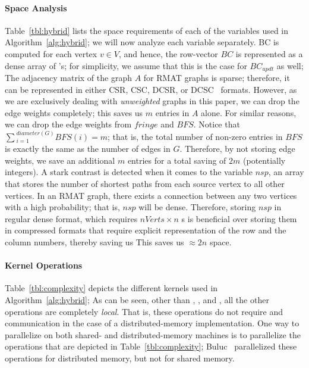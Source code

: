 \paragraph{Space Analysis}
Table~\ref{tbl:hybrid} lists the space requirements of each of the variables
used in Algorithm~\ref{alg:hybrid}; we will now analyze each variable
separately.
BC is computed for each vertex $v\in{}V$, and hence, the row-vector $BC$ is
represented as a dense array of 's; for simplicity, we assume that
this is the case for $BC_{updt}$ as well; 
%
%
The adjacency matrix of the graph $A$ for RMAT graphs is sparse; therefore, 
it can be represented in either CSR, CSC, DCSR, or DCSC~\cite{buluc-2010} 
formats.
%
However, as we are exclusively dealing with \textit{unweighted} graphs in this 
paper, we can drop the edge weights completely; this saves us $m$ entries in 
$A$ alone.
%
For similar reasons, we can drop the edge weights from $fringe$ and $BFS$.
%
Notice that $\sum{}_{i=1}^{diameter(G)}BFS(i)=m$; that is, the total number of 
non-zero entries in $BFS$ is exactly the same as the number of edges in $G$.
%
Therefore, by not storing edge weights, we save an additional $m$ entries for a
total saving of $2m$ (potentially integers).
%
%
A stark contrast is detected when it comes to the variable $nsp$, an array that
stores the number of shortest paths from each source vertex to all other
vertices.
%
In an RMAT graph, there exists a connection between any two vertices with a 
high probability; that is, $nsp$ will be dense. 
%
Therefore, storing $nsp$ in regular dense format, which requires
$nVerts\times{}n$ s is beneficial over storing them in compressed
formats that require explicit representation of the row and the column numbers,
thereby saving us This saves us $\approx{}2n$ space.

\paragraph{Kernel Operations}
Table~\ref{tbl:complexity} depicts the different kernels used in
Algorithm~\ref{alg:hybrid}; As can be seen, other than ,
, and , all the other operations are completely
\textit{local}.
%
That is, these operations do not require and communication in the case of a 
distributed-memory implementation.
%
One way to parallelize on both shared- and distributed-memory machines is to 
parallelize the operations that are depicted in Table~\ref{tbl:complexity}; 
Buluc~\cite{buluc-2010} parallelized these operations for distributed memory,
but not for shared memory.


